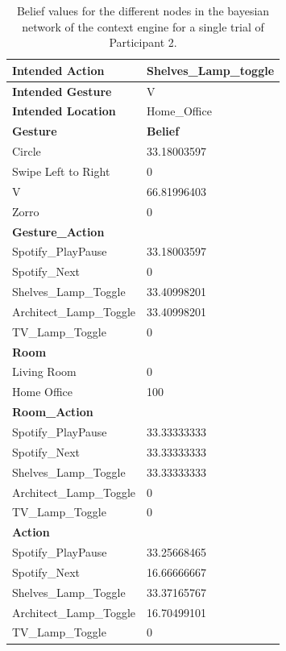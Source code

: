 \begin{table}[h]
\centering
\begin{tabular}{|l|l|}
\hline
\textbf{Intended Action}   & Shelves_Lamp_toggle \\ \hline
\textbf{Intended Gesture}  & V                   \\ \hline
\textbf{Intended Location} & Home_Office         \\ \hline
\textbf{Gesture}           & \textbf{Belief}     \\ \hline
Circle                     & 33.18003597         \\ \hline
Swipe Left to Right        & 0                   \\ \hline
V                          & 66.81996403         \\ \hline
Zorro                      & 0                   \\ \hline
\textbf{Gesture\_Action}   &                     \\ \hline
Spotify\_PlayPause         & 33.18003597         \\ \hline
Spotify\_Next              & 0                   \\ \hline
Shelves\_Lamp\_Toggle      & 33.40998201         \\ \hline
Architect\_Lamp\_Toggle    & 33.40998201         \\ \hline
TV\_Lamp\_Toggle           & 0                   \\ \hline
\textbf{Room}              &                     \\ \hline
Living Room                & 0                   \\ \hline
Home Office                & 100                 \\ \hline
\textbf{Room\_Action}      &                     \\ \hline
Spotify\_PlayPause         & 33.33333333         \\ \hline
Spotify\_Next              & 33.33333333         \\ \hline
Shelves\_Lamp\_Toggle      & 33.33333333         \\ \hline
Architect\_Lamp\_Toggle    & 0                   \\ \hline
TV\_Lamp\_Toggle           & 0                   \\ \hline
\textbf{Action}            &                     \\ \hline
Spotify\_PlayPause         & 33.25668465         \\ \hline
Spotify\_Next              & 16.66666667         \\ \hline
Shelves\_Lamp\_Toggle      & 33.37165767         \\ \hline
Architect\_Lamp\_Toggle    & 16.70499101         \\ \hline
TV\_Lamp\_Toggle           & 0                   \\ \hline
\end{tabular}
\caption{Belief values for the different nodes in the bayesian network of the context engine for a single trial of Participant 2.}
\label{table:participant-2-first-run}
\end{table}

